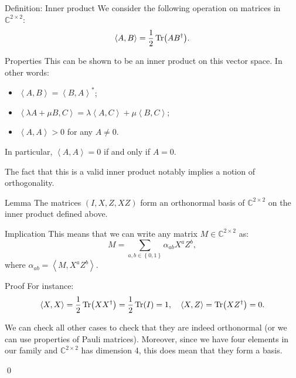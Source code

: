 \documentclass[a4paper]{article}
\begin{document}
\begin{parag}{Definition: Inner product}
    We consider the following operation on matrices in $\mathbb{C}^{2 \times 2}$: 
    \[\left\langle A, B \right\rangle = \frac{1}{2} \Tr\left(A B^{\dagger}\right).\]

    \begin{subparag}{Properties}
        This can be shown to be an inner product on this vector space. In other words:
        \begin{itemize}
            \item $\left\langle A, B \right\rangle = \left\langle B, A \right\rangle^*$;
            \item $\left\langle \lambda A + \mu B, C \right\rangle = \lambda \left\langle A, C \right\rangle + \mu \left\langle B, C \right\rangle$;
            \item $\left\langle A, A \right\rangle > 0$ for any $A \neq 0$.
        \end{itemize}

        In particular, $\left\langle A, A \right\rangle = 0$ if and only if $A = 0$.

        The fact that this is a valid inner product notably implies a notion of orthogonality.
    \end{subparag}
\end{parag}

\begin{parag}{Lemma}
    The matrices $\left(I, X, Z, X Z\right)$ form an orthonormal basis of $\mathbb{C}^{2 \times 2}$ on the inner product defined above. 

    \begin{subparag}{Implication}
        This means that we can write any matrix $M \in \mathbb{C}^{2 \times 2}$ as: 
        \[M = \sum_{a, b \in \left\{0, 1\right\}} \alpha_{ab} X^a Z^b,\]
        where $\alpha_{ab} = \left\langle M, X^a Z^b \right\rangle$.
    \end{subparag}

    \begin{subparag}{Proof}
        For instance: 
        \[\left\langle X, X \right\rangle = \frac{1}{2} \Tr\left(X X^{\dagger}\right) = \frac{1}{2} \Tr\left(I\right) = 1, \mathspace \left\langle X, Z \right\rangle = \Tr\left(X Z^{\dagger}\right) = 0.\]

        We can check all other cases to check that they are indeed orthonormal (or we can use properties of Pauli matrices). Moreover, since we have four elements in our family and $\mathbb{C}^{2 \times 2}$ has dimension 4, this does mean that they form a basis.

        \qed
    \end{subparag}
\end{parag}
\end{document}

